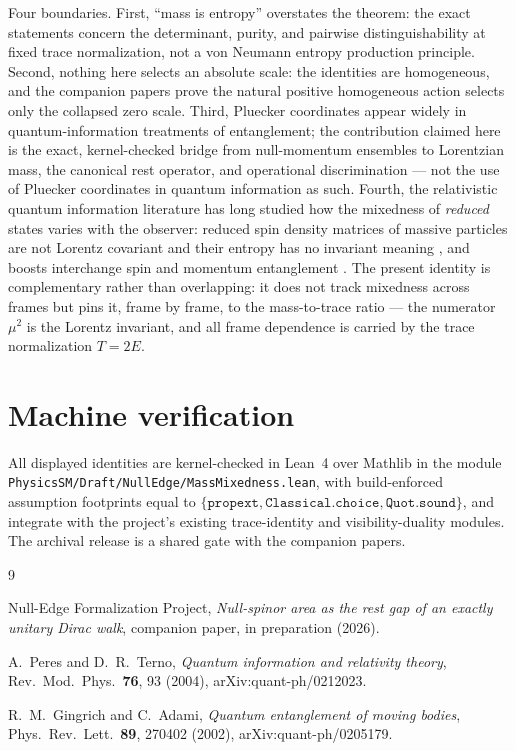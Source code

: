 \documentclass[11pt]{article}
\begin{document}
Four boundaries.  First, ``mass is entropy'' overstates the theorem: the
exact statements concern the determinant, purity, and pairwise
distinguishability at fixed trace normalization, not a von Neumann entropy
production principle.  Second, nothing here selects an absolute scale: the
identities are homogeneous, and the companion papers prove the natural
positive homogeneous action selects only the collapsed zero scale.  Third,
Pluecker coordinates appear widely in quantum-information treatments of
entanglement; the contribution claimed here is the exact, kernel-checked
bridge from null-momentum ensembles to Lorentzian mass, the canonical rest
operator, and operational discrimination --- not the use of Pluecker
coordinates in quantum information as such.  Fourth, the relativistic
quantum information literature has long studied how the mixedness of
\emph{reduced} states varies with the observer: reduced spin density
matrices of massive particles are not Lorentz covariant and their entropy
has no invariant meaning \cite{PeresTerno}, and boosts interchange spin and
momentum entanglement \cite{GingrichAdami}.  The present identity is
complementary rather than overlapping: it does not track mixedness across
frames but pins it, frame by frame, to the mass-to-trace ratio --- the
numerator $\mu^2$ is the Lorentz invariant, and all frame dependence is
carried by the trace normalization $T=2E$.

\appendix
\section{Machine verification}

All displayed identities are kernel-checked in Lean~4 over Mathlib in the
module \texttt{PhysicsSM/Draft/NullEdge/MassMixedness.lean}, with
build-enforced assumption footprints equal to
$\{\mathtt{propext},\mathtt{Classical.choice},\mathtt{Quot.sound}\}$, and
integrate with the project's existing trace-identity and visibility-duality
modules.  The archival release is a shared gate with the companion papers.

\begin{thebibliography}{9}

Null-Edge Formalization Project,
\emph{Null-spinor area as the rest gap of an exactly unitary Dirac walk},
companion paper, in preparation (2026).

A.~Peres and D.~R.~Terno,
\emph{Quantum information and relativity theory},
Rev.\ Mod.\ Phys.\ \textbf{76}, 93 (2004), arXiv:quant-ph/0212023.

R.~M.~Gingrich and C.~Adami,
\emph{Quantum entanglement of moving bodies},
Phys.\ Rev.\ Lett.\ \textbf{89}, 270402 (2002), arXiv:quant-ph/0205179.

\end{thebibliography}
\end{document}
